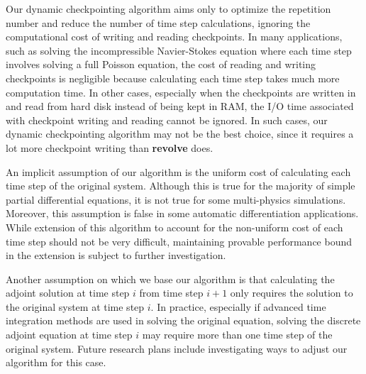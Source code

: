 Our dynamic checkpointing algorithm aims only to optimize the repetition number
and reduce the number of time step calculations, ignoring the computational
cost of writing and reading checkpoints.  In many applications, such as
solving the incompressible Navier-Stokes equation where each time step involves
solving a full Poisson equation, the cost of reading and writing checkpoints
is negligible because calculating each time step takes much more computation
time.  In other cases, especially when the checkpoints are written in and read
from hard disk instead of being kept in RAM, the I/O time associated with
checkpoint writing and reading cannot be ignored.  In such cases, our dynamic
checkpointing algorithm may not be the best choice, since it requires a lot
more checkpoint writing than {\bf revolve} does.

An implicit assumption of our algorithm is the uniform cost of calculating
each time step of the original system.  Although this is true for the majority
of simple partial differential equations, it is not true for some multi-physics
simulations.  Moreover, this assumption is false in some automatic
differentiation applications.  While extension of this algorithm to account for
the non-uniform cost of each time step should not be very difficult, maintaining
provable performance bound in the extension is subject to further investigation.

Another assumption on which we base our algorithm is that calculating the
adjoint solution at time step $i$ from time step $i + 1$ only requires the
solution to the original system at time step $i$.  In practice, especially
if advanced time integration methods are used in solving the original equation,
solving the discrete adjoint equation at time step $i$ may require more than
one time step of the original system.  Future research plans include
investigating ways to adjust our algorithm for this case.

